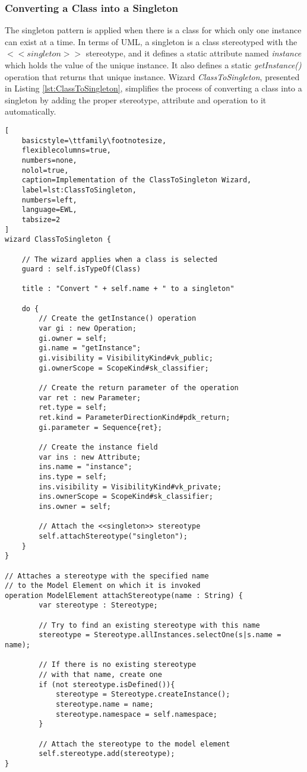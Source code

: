 \subsubsection{Converting a Class into a Singleton}
\label{sec:ClassToSingleton}

The singleton pattern \cite{Larman} is applied when there is a class for which only one instance can exist at a time. In terms of UML, a singleton is a class stereotyped with the $<<singleton>>$ stereotype, and it defines a static attribute named \emph{instance} which holds the value of the unique instance. It also defines a static \emph{getInstance()} operation that returns that unique instance. Wizard \emph{ClassToSingleton}, presented in Listing \ref{lst:ClassToSingleton}, simplifies the process of converting a class into a singleton by adding the proper stereotype, attribute and operation to it automatically.

\begin{lstlisting}[ 
	basicstyle=\ttfamily\footnotesize, 
	flexiblecolumns=true,
	numbers=none,
	nolol=true,
	caption=Implementation of the ClassToSingleton Wizard, 
	label=lst:ClassToSingleton,
	numbers=left,
	language=EWL,
	tabsize=2
]
wizard ClassToSingleton {
	
	// The wizard applies when a class is selected
	guard : self.isTypeOf(Class)
	
	title : "Convert " + self.name + " to a singleton"
	
	do {
		// Create the getInstance() operation 
		var gi : new Operation; 
		gi.owner = self; 
		gi.name = "getInstance"; 
		gi.visibility = VisibilityKind#vk_public; 
		gi.ownerScope = ScopeKind#sk_classifier; 
		
		// Create the return parameter of the operation 
		var ret : new Parameter; 
		ret.type = self; 
		ret.kind = ParameterDirectionKind#pdk_return; 
		gi.parameter = Sequence{ret}; 
		
		// Create the instance field 
		var ins : new Attribute; 
		ins.name = "instance"; 
		ins.type = self; 
		ins.visibility = VisibilityKind#vk_private; 
		ins.ownerScope = ScopeKind#sk_classifier; 
		ins.owner = self; 
		
		// Attach the <<singleton>> stereotype 
		self.attachStereotype("singleton");
	}
}

// Attaches a stereotype with the specified name
// to the Model Element on which it is invoked
operation ModelElement attachStereotype(name : String) {
		var stereotype : Stereotype;
		
		// Try to find an existing stereotype with this name
		stereotype = Stereotype.allInstances.selectOne(s|s.name = name);
		
		// If there is no existing stereotype
		// with that name, create one
		if (not stereotype.isDefined()){
			stereotype = Stereotype.createInstance();
			stereotype.name = name;
			stereotype.namespace = self.namespace;
		}
		
		// Attach the stereotype to the model element
		self.stereotype.add(stereotype);
}
\end{lstlisting}

